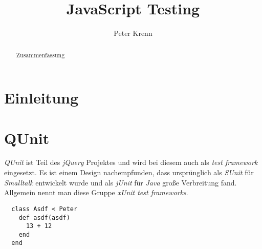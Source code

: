 \documentclass[10pt, a4paper]{article}
\title{JavaScript Testing}
\author{Peter Krenn}
\begin{document}
\maketitle

\begin{abstract}
Zusammenfassung
\end{abstract}

\tableofcontents

\section{Einleitung}

\section{QUnit}

\emph{QUnit}\cite{zaefferer_qunit_2011} ist Teil des \emph{jQuery}
Projektes\cite{resig_jquery_2011} und wird bei diesem auch als \emph{test
framework} eingesetzt. Es ist einem Design nachempfunden, dass ursprünglich als
\emph{SUnit}\cite{beck_simple_1994} für \emph{Smalltalk} entwickelt wurde und als \emph{jUnit} für
\emph{Java} große Verbreitung fand. Allgemein nennt man diese Gruppe
\emph{xUnit test frameworks}\cite{fowler_xunit_2010}.

\begin{verbatim}
  class Asdf < Peter
    def asdf(asdf)
      13 + 12
    end
  end
\end{verbatim}

\begin{flushleft}
  
  
\end{flushleft}
\end{document}
